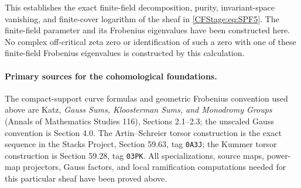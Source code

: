 This establishes the exact finite-field decomposition,
purity, invariant-space vanishing, and finite-cover
logarithm of the sheaf in \eqref{CFStage:eq:SPF5}. The finite-field
parameter and its Frobenius eigenvalues have been
constructed here. No complex off-critical zeta zero or
identification of such a zero with one of these finite-field
Frobenius eigenvalues is constructed by this calculation.

\paragraph{Primary sources for the cohomological foundations.}
The compact-support curve formulas and geometric Frobenius
convention used above are Katz,
\emph{Gauss Sums, Kloosterman Sums, and Monodromy Groups}
(Annals of Mathematics Studies 116), Sections 2.1--2.3;
the unscaled Gauss convention is Section 4.0.
The Artin--Schreier torsor construction is the exact
sequence in the Stacks Project, Section 59.63, tag
\texttt{0A3J}; the Kummer torsor construction is Section
59.28, tag \texttt{03PK}.
All specializations, source maps, power-map projectors,
Gauss factors, and local ramification computations needed
for this particular sheaf have been proved above.
